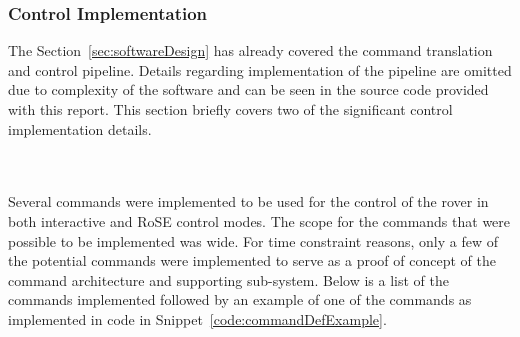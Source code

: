     \subsubsection{Control Implementation}
      The Section~\ref{sec:softwareDesign} has already covered the command translation and control pipeline. Details regarding implementation of the pipeline are omitted due to complexity of the software and can be seen in the source code provided with this report. This section briefly covers two of the significant control implementation details.
      
      \\\\
        Several commands were implemented to be used for the control of the rover in both interactive and RoSE control modes. The scope for the commands that were possible to be implemented was wide. For time constraint reasons, only a few of the potential commands were implemented to serve as a proof of concept of the command architecture and supporting sub-system. Below is a list of the commands implemented followed by an example of one of the commands as implemented in code in Snippet~\ref{code:commandDefExample}.
        
